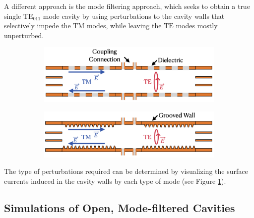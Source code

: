 A different approach is the mode filtering approach, which seeks to obtain a true single $\mathrm{TE}_{011}$ mode cavity by using perturbations to the cavity walls that selectively impede the $\mathrm{TM}$ modes, while leaving the $\mathrm{TE}$ modes mostly unperturbed.
\begin{figure}[htbp]
    \centering
    \begin{subfigure}{0.7\textwidth}
        \centering
        \includegraphics*[width=\textwidth]{figs/Chapter-6/230608_insulator_mode_filter_cartoon.png}
        \caption{}
    \end{subfigure}
    \hfill
    \begin{subfigure}{0.7\textwidth}
        \centering
        \includegraphics*[width=\textwidth]{figs/Chapter-6/230608_grooved_mode_filter_cartoon.png}
        \caption{}
    \end{subfigure}
    \caption{\label{fig:chap6-mode-filter-cartoons}}
\end{figure}
The type of perturbations required can be determined by visualizing the surface currents induced in the cavity walls by each type of mode (see Figure \ref{fig:chap6-mode-filter-cartoons}).

\subsection{Simulations of Open, Mode-filtered Cavities}

